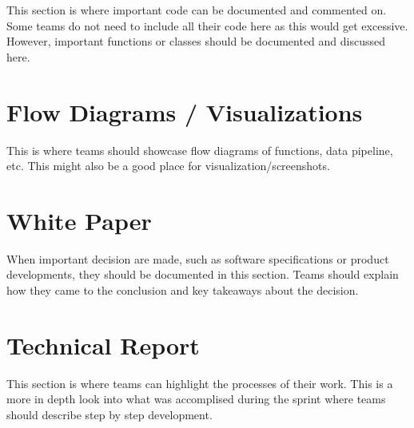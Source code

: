 \documentclass[]{book}
\begin{document}
This section is where important code can be documented and commented on.
Some teams do not need to include all their code here as this would get
excessive. However, important functions or classes should be documented
and discussed here.

\section{Flow Diagrams /
Visualizations}\label{flow-diagrams-visualizations}

This is where teams should showcase flow diagrams of functions, data
pipeline, etc. This might also be a good place for
visualization/screenshots.

\section{White Paper}\label{white-paper}

When important decision are made, such as software specifications or
product developments, they should be documented in this section. Teams
should explain how they came to the conclusion and key takeaways about
the decision.

\section{Technical Report}\label{technical-report}

This section is where teams can highlight the processes of their work.
This is a more in depth look into what was accomplised during the sprint
where teams should describe step by step development.
\end{document}
